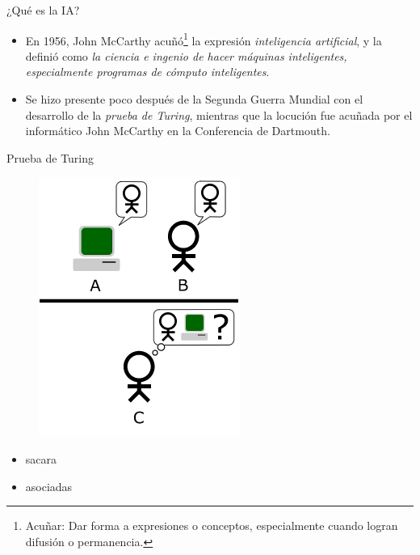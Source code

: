 \documentclass[11pt,aspectratio=169]{beamer}
\begin{document}
\begin{frame}{¿Qué es la IA?}
    \begin{itemize}
        \item En 1956, John McCarthy acuñó\footnote{Acuñar: Dar forma a expresiones o 
            conceptos, especialmente cuando logran difusión o permanencia.} la expresión 
            \textit{inteligencia artificial}, y la definió como \textit{la ciencia e ingenio 
            de hacer máquinas inteligentes, especialmente programas de cómputo inteligentes}.
            \pause
        \item Se hizo presente poco después de la Segunda Guerra Mundial con el desarrollo 
            de la \textit{prueba de Turing}, mientras que la locución fue acuñada 
            por el informático John McCarthy en la Conferencia de Dartmouth. 
    \end{itemize}
\end{frame}

\begin{frame}{Prueba de Turing}
    \begin{multicols}{2}
    \begin{figure}
        \centering
        \includegraphics[scale=0.75]{img/Turing_Test_version_3.png}
    \end{figure}
    \begin{itemize}
        \item sacara
        \item asociadas
    \end{itemize}
\end{multicols}
\end{frame}
\end{document}
